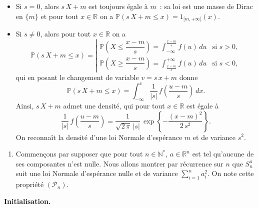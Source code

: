 \begin{itemize}
\item
  Si \(s = 0\), alors \(s\,X + m\) est toujours égale à \(m\)~: sa loi
  est une masse de Dirac en \(\{m\}\) et pour tout \(x\in\mathbb{R}\) on
  a \(\mathbb{P}\left(s\,X +m \leq x\right) = 1_{[m,+\infty[}(x)\).
\item
  Si \(s\neq 0\), alors pour tout \(x\in\mathbb{R}\) on a
  \[\mathbb{P}\left( s\,X + m \leq x \right) = \left|\begin{array}{ll}\displaystyle\mathbb{P}\left( X \leq \dfrac{x-m}{s} \right) = \int_{-\infty}^{\frac{x-m}{s}} f(u)\,du & \text{si } s>0,\\[1em] \displaystyle \mathbb{P}\left( X \geq \dfrac{x-m}{s} \right) = \int_{\frac{x-m}{s}}^{+\infty} f(u)\,du & \text{si } s<0,\end{array}\right.\]
  qui en posant le changement de variable \(v = s\,x+m\) donne
  \[\mathbb{P}\left( s\,X + m \leq x \right) = \int_{-\infty}^{x} \dfrac{1}{|s|}\,f\left(\dfrac{u-m}{s} \right)\,dx.\]
  Ainsi, \(s\,X+m\) admet une densité, qui pour tout \(x\in\mathbb{R}\)
  est égale à
  \[ \dfrac{1}{|s|}\,f\left(\dfrac{u-m}{s}\right) = \dfrac{1}{\sqrt{2\,\pi}\,|s|}\,\exp\left\{-\dfrac{(x-m)^2}{2\,s^2} \right\}.\]
  On reconnaît la densité d'une loi Normale d'espérance \(m\) et de
  variance \(s^2\).
\end{itemize}

\label{II-answer-CLIGauss-cl}

\begin{enumerate}
\def\labelenumi{\arabic{enumi}.}
\setcounter{enumi}{1}
\tightlist
\item
  Commençons par supposer que pour tout \(n\in\mathbb{N}^\ast\),
  \(a\in\mathbb{R}^n\) est tel qu'aucune de ses composantes n'est nulle.
  Nous allons montrer par récurrence sur \(n\) que \(S_n^a\) suit une
  loi Normale d'espérance nulle et de variance \(\sum_{i = 1}^n a_i^2\).
  On note cette propriété \((\mathcal{P}_n)\).
\end{enumerate}

\textbf{Initialisation.}

